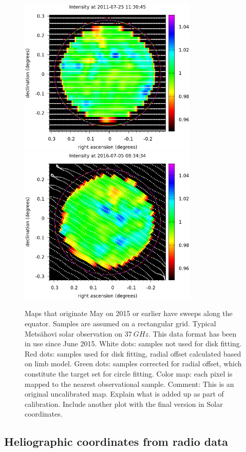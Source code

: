 \documentclass{aa}
\begin{document}
\begin{figure}
\centering
\includegraphics[width=8.5cm]{nea1311582408.png}
\includegraphics[width=8.5cm]{nea1467696874.png}
\caption{Maps that originate May on 2015 or earlier have sweeps along the equator. Samples are assumed on a rectangular grid.
Typical Mets\"ahovi solar observation on $\SI{37}{GHz}$. This data format has been in use since June 2015. White dots: samples not used for disk fitting. Red 
dots: samples used for disk fitting, radial offset calculated based on limb model. Green dots: samples corrected for 
radial offset, which constitute the target set for circle fitting. Color map: each pixel is mapped to the nearest 
observational sample. Comment: This is an original uncalibrated map. Explain what is added up as part of calibration. Include another plot with the final version in Solar coordinates.
\label{oldmap}\label{typicalmap}}
\end{figure}


\subsection{Heliographic coordinates from radio data}
\end{document}
